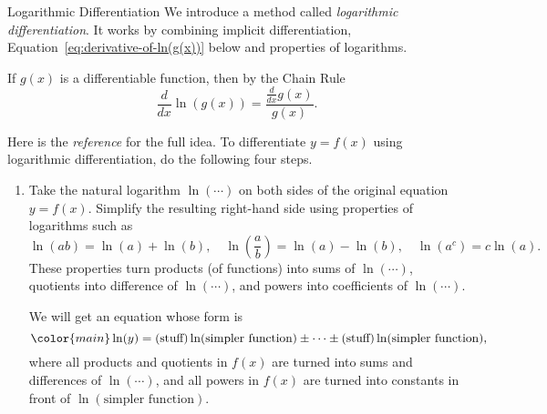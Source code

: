 \documentclass[../main.tex]{subfiles}
\begin{document}
\begin{lesson}{Logarithmic Differentiation}
  We introduce a method called \emph{logarithmic differentiation}. It works by combining implicit differentiation, Equation~\eqref{eq:derivative-of-ln(g(x))} below and properties of logarithms.
  \begin{mdframed}[style=withref]
    If \(g(x)\) is a differentiable function, then by the Chain Rule
    \begin{equation} \label{eq:derivative-of-ln(g(x))}
      \frac{d}{dx} \ln( g(x) ) = \frac{\frac{d}{dx}g(x)}{g(x)}.
    \end{equation}

  \end{mdframed}


  Here is the \emph{reference} for the full idea. To differentiate \(y = f(x)\) using logarithmic differentiation, do the following four steps.
  \begin{enumerate}
    \item Take the natural logarithm \(\ln(\cdots{})\) on both sides of the original equation \(y = f(x)\). Simplify the resulting right-hand side using properties of logarithms such as 
      \[
        \ln(ab) = \ln(a) + \ln(b), \quad \ln\left(\frac{a}{b}\right) = \ln(a) - \ln(b), \quad \ln(a^{c}) = c \ln(a). 
      \]
      These properties turn products (of functions) into sums of \(\ln(\cdots)\), quotients into difference of \(\ln(\cdots)\), and powers into coefficients of \(\ln(\cdots)\).

      We will get an equation whose form is 
      \begin{equation} \label{eq:logarithmic-differentiation}
        \color{main}
        \ln(y) = (\text{stuff})\ln( \text{simpler function} ) \pm \cdots \pm (\text{stuff})\ln( \text{simpler function} ),
      \end{equation}
      where all products and quotients in \(f(x)\) are turned into sums and differences of \(\ln(\cdots)\), and all powers in \(f(x)\) are turned into constants in front of \(\ln(\text{simpler function})\).



\end{enumerate}
\end{lesson}
\end{document}
